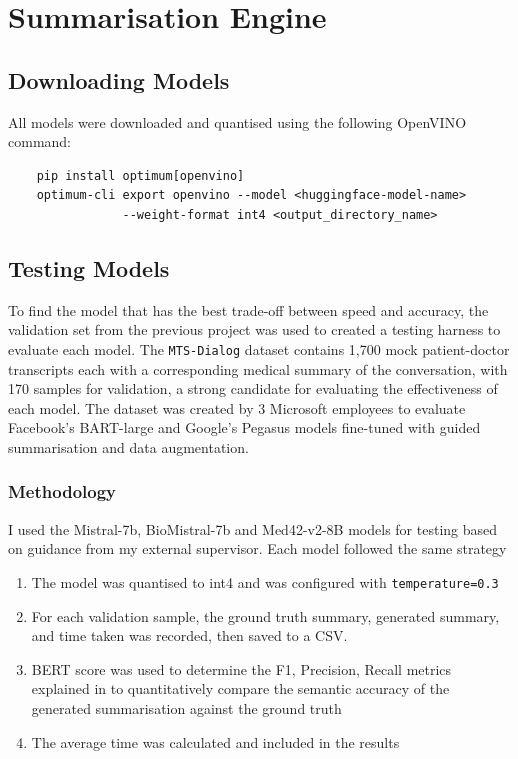 \section{Summarisation Engine}
\label{sec:med42testj}
\subsection{Downloading Models}
All models were downloaded and quantised using the following OpenVINO command:
\begin{verbatim}
    pip install optimum[openvino]
    optimum-cli export openvino --model <huggingface-model-name> 
                --weight-format int4 <output_directory_name>
\end{verbatim}  

\subsection{Testing Models}
To find the model that has the best trade-off between speed and accuracy, the validation set from the previous project was used to created a testing harness to evaluate each model. The \texttt{MTS-Dialog}\cite{mts-dialog} dataset contains 1,700 mock patient-doctor transcripts each with a corresponding medical summary of the conversation, with 170 samples for validation, a strong candidate for evaluating the effectiveness of each model. The dataset was created by 3 Microsoft employees to evaluate Facebook's BART-large \cite{bart} and Google's Pegasus \cite{pegasus} models fine-tuned with guided summarisation and data augmentation. 

\subsubsection{Methodology}
\label{di:test_med42}
I used the Mistral-7b, BioMistral-7b and Med42-v2-8B models for testing based on guidance from my external supervisor. Each model followed the same strategy 
\begin{enumerate}
    \item The model was quantised to int4 and was configured with \texttt{temperature=0.3} \cite{med42temp}
    \item For each validation sample, the ground truth summary, generated summary, and time taken was recorded, then saved to a CSV.
    \item BERT score was used to determine the F1, Precision, Recall metrics explained in \cite{zhang2019bertscore} to quantitatively compare the semantic accuracy of the generated summarisation against the ground truth
    \item The average time was calculated and included in the results
\end{enumerate}

